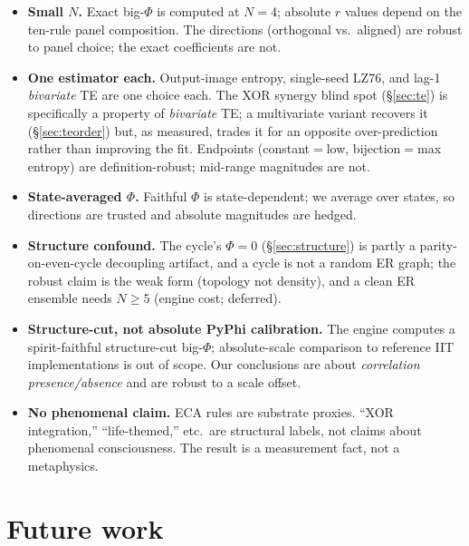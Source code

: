 \documentclass[11pt,a4paper]{article}
\newcommand{\bigphi}{\ensuremath{\Phi}}
\begin{document}
\begin{itemize}\itemsep0.25em
\item \textbf{Small \(N\).} Exact big-\bigphi{} is computed at \(N=4\);
absolute \(r\) values depend on the ten-rule panel composition. The
directions (orthogonal vs.\ aligned) are robust to panel choice; the exact
coefficients are not.
\item \textbf{One estimator each.} Output-image entropy, single-seed LZ76,
and lag-1 \emph{bivariate} TE are one choice each. The XOR synergy blind
spot (\S\ref{sec:te}) is specifically a property of \emph{bivariate} TE;
a multivariate variant recovers it (\S\ref{sec:teorder}) but, as measured,
trades it for an opposite over-prediction rather than improving the fit.
Endpoints (constant\(=\)low, bijection\(=\)max entropy) are
definition-robust; mid-range magnitudes are not.
\item \textbf{State-averaged \bigphi{}.} Faithful \bigphi{} is
state-dependent; we average over states, so directions are trusted and
absolute magnitudes are hedged.
\item \textbf{Structure confound.} The cycle's \(\bigphi=0\)
(\S\ref{sec:structure}) is partly a parity-on-even-cycle decoupling
artifact, and a cycle is not a random ER graph; the robust claim is the
weak form (topology not density), and a clean ER ensemble needs
\(N\ge5\) (engine cost; deferred).
\item \textbf{Structure-cut, not absolute PyPhi calibration.} The engine
computes a spirit-faithful structure-cut big-\bigphi{}; absolute-scale
comparison to reference IIT implementations is out of scope. Our
conclusions are about \emph{correlation presence/absence} and are robust
to a scale offset.
\item \textbf{No phenomenal claim.} ECA rules are substrate proxies. ``XOR
integration,'' ``life-themed,'' etc.\ are structural labels, not claims
about phenomenal consciousness. The result is a measurement fact, not a
metaphysics.
\end{itemize}

\section{Future work}
\label{sec:future}
\end{document}
